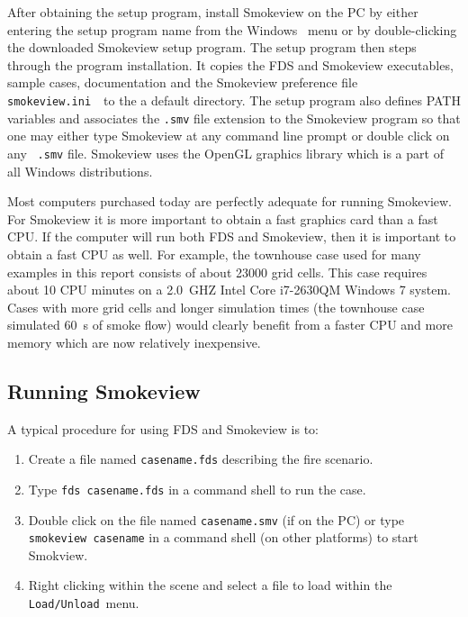 \documentclass[11pt,twoside]{book}
\newcommand{\svini}{{\tt smokeview.ini}\ }
\begin{document}
After obtaining the setup program, install Smokeview  on the PC by
either entering the setup program name from the Windows
\ menu or by double-clicking the downloaded
Smokeview  setup program. The setup program then steps through the
program installation. It copies the FDS and Smokeview executables,
sample cases, documentation and the Smokeview preference file
\svini\ to the a default directory.  The setup program also
defines PATH variables and associates the {\tt .smv} file
extension to the Smokeview program so that one may either type
Smokeview at any command line prompt or double click on any {\tt
.smv} file. Smokeview uses the OpenGL graphics library which is a
part of all Windows distributions.

Most computers purchased today are perfectly adequate for running
Smokeview. For Smokeview it is more important to obtain a fast
graphics card than a fast CPU. If the computer will run both FDS
and Smokeview, then it is important to obtain a fast CPU as well.
For example, the townhouse case used for many examples in this
report consists of about 23000 grid cells.  This case requires
about 10 CPU minutes on a 2.0~GHZ Intel Core i7-2630QM Windows 7
system. Cases with more grid cells and longer simulation times
(the townhouse case simulated 60~s of smoke flow) would clearly
benefit from a faster CPU and more memory which are now relatively
inexpensive.


\subsection{Running Smokeview}

A typical procedure for using FDS and Smokeview is to:
\begin{enumerate}

\item Create a file named {\tt casename.fds} describing the fire
scenario.

\item Type {\tt fds~casename.fds} in a command shell to run the
case.

\item Double click on the file named {\tt casename.smv} (if on the
PC) or type {\tt smokeview~casename} in a command shell (on other
platforms) to start Smokview.

\item Right clicking within the scene and select a file to load
within the {\tt Load/Unload}\ menu.
\end{enumerate}
\end{document}
